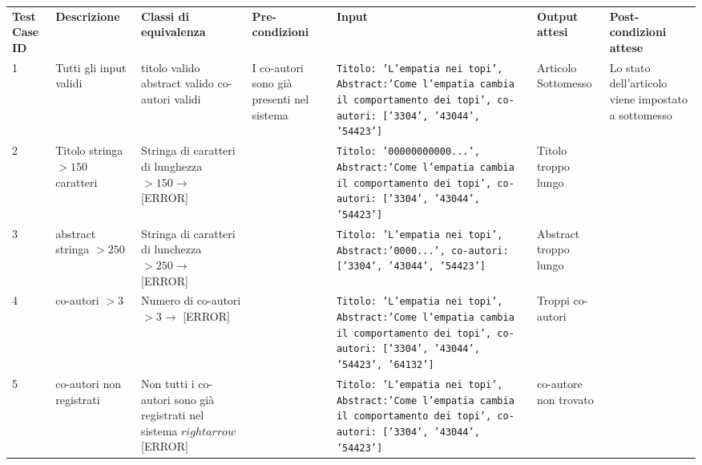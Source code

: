 \begin{sidewaystable}
  \small
  \centering
  \begin{tabular}{|p{2cm}|p{3cm}|p{3cm}|p{3cm}|p{3cm}|p{3cm}|p{2.5cm}|}
    \hline
    \rowcolor{SkyBlue}
    \multicolumn{7}{l}{\textbf{Test Suite: Sottomissione di un articolo}}\\
    \hline
        \rowcolor{Red}
    \textbf{Test Case ID} & \textbf{Descrizione} & \textbf{Classi di equivalenza} & \textbf{Pre\hyp{}condizioni} & \textbf{Input} & \textbf{Output attesi} &\textbf{Post\hyp{}condizioni attese }\\
    \hline
    1 & Tutti gli input validi & titolo valido abstract valido co-autori validi & I co\hyp{}autori sono già presenti nel sistema & \texttt{Titolo: 'L'empatia nei topi', Abstract:'Come l'empatia cambia il comportamento dei topi', co-autori: ['3304', '43044', '54423']}& Articolo Sottomesso & Lo stato dell'articolo viene impostato a sottomesso \\
    \hline
    2 & Titolo stringa \(>150\) caratteri & Stringa di caratteri di lunghezza \(> 150 \rightarrow\) [ERROR]  & & \texttt{Titolo: '00000000000...', Abstract:'Come l'empatia cambia il comportamento dei topi', co-autori: ['3304', '43044', '54423']} & Titolo troppo lungo & \\
    \hline
    3 & abstract stringa \(> 250\) & Stringa di caratteri di lunchezza \(> 250 \rightarrow\) [ERROR] & &  \texttt{Titolo: 'L'empatia nei topi', Abstract:'0000...', co-autori: ['3304', '43044', '54423']} & Abstract troppo lungo & \\
    \hline
    4 & co\hyp{}autori \(> 3\) & Numero di co-autori \(> 3 \rightarrow\) [ERROR] & &\texttt{Titolo: 'L'empatia nei topi', Abstract:'Come l'empatia cambia il comportamento dei topi', co-autori: ['3304', '43044', '54423', '64132']} & Troppi co\hyp{}autori & \\
    \hline
    5 & co\hyp{}autori non registrati & Non tutti i co-autori sono già registrati nel sistema \(rightarrow\) [ERROR]  & &\texttt{Titolo: 'L'empatia nei topi', Abstract:'Come l'empatia cambia il comportamento dei topi', co-autori: ['3304', '43044', '54423']} & co\hyp{}autore non trovato & \\
    \hline
  \end{tabular}
\end{sidewaystable}

